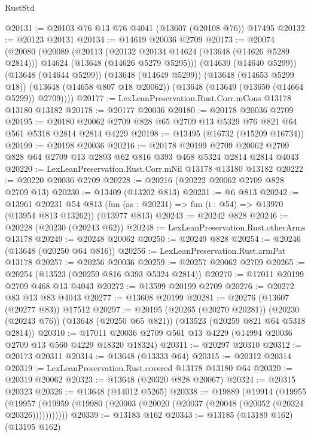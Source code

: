 \begin{lexlean}{RustStd}
\begin{coremodule}
@20131 := @20103 @76 @13 @76 @4041 (@13607 (@20108 @76)) @17495
@20132 := @20123 @20131
@20134 := @14619 @20036 @2709
@20173 := @20074
    (@20080
      (@20089
        (@20113
          (@20132 @20134 @14624 (@13648 (@14626 @5289 @2814)))
          @14624
          (@13648 (@14626 @5279 @5295)))
        (@14639 (@14640 @5299))
        (@13648 (@14644 @5299))
        (@13648 (@14649 @5299))
        (@13648 (@14653 @5299 @18))
        (@13648 (@14658 @807 @18 @20062))
        (@13648 (@13649 (@13650 (@14664 @5299)) @2709))))
@20177 := LexLeanPreservation.Rust.Corr.mCons @13178 @13180 @13182
@20178 := @20177 @20036
@20180 := @20178 @20036 @2709
@20195 := @20180 @20062 @2709 @828 @65 @2709 @13 @5329 @76 @821 @64 @561 @5318 @2814 @2814 @4229
@20198 := @13495 (@16732 (@15209 @16734))
@20199 := @20198 @20036
@20216 := @20178
    @20199
    @2709
    @20062
    @2709
    @828
    @64
    @2709
    @13
    @2893
    @62
    @816
    @393
    @468
    @5324
    @2814
    @2814
    @4043
@20220 := LexLeanPreservation.Rust.Corr.mNil @13178 @13180 @13182
@20222 := @20220 @20036 @2709
@20228 := @20216 (@20222 @20062 @2709 @828 @2709 @13)
@20230 := @13409 (@13202 @813)
@20231 := @6 @813
@20242 := @13961
    @20231
    @54
    @813
    (fun (as : @20231) => fun (i : @54) => @13970 (@13954 @813 @13262))
    (@13977 @813)
@20243 := @20242 @828
@20246 := @20228 (@20230 (@20243 @62))
@20248 := LexLeanPreservation.Rust.otherArms @13178
@20249 := @20248 @20062
@20250 := @20249 @828
@20254 := @20246 (@13648 (@20250 @64 @816))
@20256 := LexLeanPreservation.Rust.armPat @13178
@20257 := @20256 @20036
@20259 := @20257 @20062 @2709
@20265 := @20254 (@13523 (@20259 @816 @393 @5324 @2814))
@20270 := @17011 @20199 @2709 @468 @13 @4043
@20272 := @13599 @20199 @2709
@20276 := @20272 @83 @13 @83 @4043
@20277 := @13608 @20199
@20281 := @20276 (@13607 (@20277 @83)) @17512
@20297 := @20195
    (@20265 (@20270 @20281))
    (@20230 (@20243 @76))
    (@13648 (@20250 @65 @821))
    (@13523 (@20259 @821 @64 @5318 @2814))
@20310 := @17011 @20036 @2709 @561 @13 @4229 (@14994 @20036 @2709 @13 @560 @4229 @18320 @18324)
@20311 := @20297 @20310
@20312 := @20173 @20311
@20314 := @13648 (@13333 @64)
@20315 := @20312 @20314
@20319 := LexLeanPreservation.Rust.covered @13178 @13180 @64
@20320 := @20319 @20062
@20323 := @13648 (@20320 @828 @20067)
@20324 := @20315 @20323
@20326 := @13648 (@14012 @5265)
@20338 := @19889
    (@19914
      (@19955
        (@19957 (@19959 (@19980 (@20003 (@20020 (@20037 (@20048 (@20052 (@20324 @20326)))))))))))
@20339 := @13183 @162
@20343 := @13185 (@13189 @162) (@13195 @162)

\end{coremodule}
\end{lexlean}
